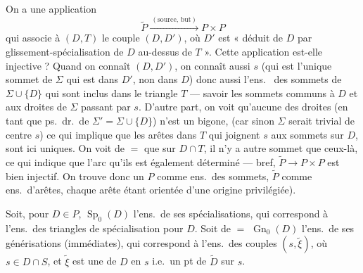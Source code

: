 \documentclass[11pt,a4paper]{article}
\begin{document}
On a une application
\[
\widetilde{P} \xrightarrow{\ (\mathrm{source},\,\mathrm{but})\ } P \times P
\]
qui associe à $(D, T)$ le couple $(D, D')$, où $D'$ est « déduit de $D$ par  glissement-spécialisation de $D$ au-dessus de $T$ ». Cette application est-elle injective ? Quand on connaît $(D, D')$, on connaît aussi $s$ (qui est l'unique sommet de $\Sigma$ qui est dans $D'$, non dans $D$) donc aussi l'ens.\  des  sommets de $\Sigma \cup \lbrace D \rbrace$ qui sont inclus dans le triangle $T$ --- savoir les sommets communs à $D$ et aux  droites de $\Sigma$ passant par $s$. D'autre part, on voit qu'aucune des \struck{\ill{}} droites (en tant que ps.\ dr.\ de \struck{\ill{}} $\Sigma' = \Sigma \cup \lbrace D \rbrace$) n'est un bigone, \struck{\ill{}} (car sinon $\Sigma$ serait trivial de centre $s$) ce qui implique que les arêtes \struck{\ill{}}  dans $T$ qui joignent $s$ aux sommets \struck{\ill{}}  sur $D$, sont ici uniques.  On voit de $=$ que sur $D \cap T$, il n'y a  autre sommet que ceux-là, ce qui indique que l'arc qu'ils  est également déterminé --- bref, $\widetilde{P} \to P \times P$ est bien injectif. On trouve donc un   \ill{} $P$ comme ens.\ des sommets, $\widetilde{P}$ comme ens.\ d'arêtes, chaque arête étant orientée \struck{\ill{}}  d'une origine privilégiée).

Soit, pour $D \in P$, $\operatorname{Sp}_0(D)$ l'ens.\ de ses  spécialisations,  qui correspond à l'ens.\ des triangles de spécialisation  pour $D$. Soit de $=$ $\operatorname{Gn}_0(D)$ l'ens.\ de ses générisations (immédiates), qui correspond à l'ens.\ des couples $(s, \widetilde{\xi})$, où $s \in D \cap S$, et $\widetilde{\xi}$ est une  de $D$ en $s$ i.e.\ un pt de $\widetilde{D}$ sur $s$.
\end{document}
